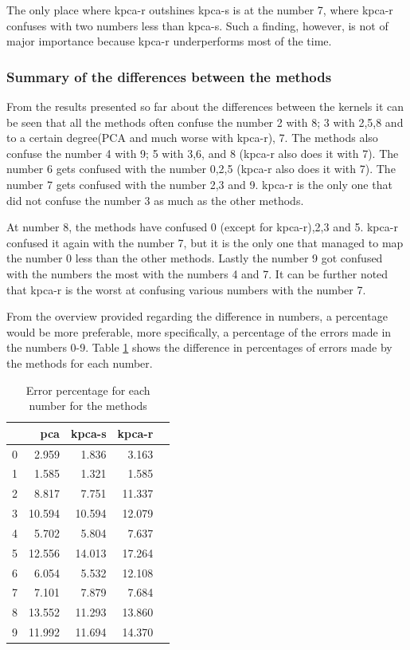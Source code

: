 The only place where \gls{kpca-r} outshines \gls{kpca-s} is at the number 7, where \gls{kpca-r} confuses with two numbers less than \gls{kpca-s}. Such a finding, however, is not of major importance because \gls{kpca-r} underperforms most of the time. 

\subsubsection{Summary of the differences between the methods}
From the results presented so far about the differences between the kernels it can be seen that all the methods often confuse the number 2 with 8; 3 with 2,5,8 and to a certain degree(PCA and much worse with \gls{kpca-r}), 7. The methods also confuse the number 4 with 9; 5 with 3,6, and 8 (\gls{kpca-r} also does it with 7). The number 6 gets confused with the number 0,2,5 (\gls{kpca-r} also does it with 7).
The number 7 gets confused with the number 2,3 and 9. \gls{kpca-r} is the only one that did not confuse the number 3 as much as the other methods.

At number 8, the methods have confused 0 (except for \gls{kpca-r}),2,3 and 5. \gls{kpca-r} confused it again with the number 7, but it is the only one that managed to map the number 0 less than the other methods. Lastly the number 9 got confused with the numbers the most with the numbers 4 and 7. It can be further noted that \gls{kpca-r} is the worst at confusing various numbers with the number 7.


From the overview provided regarding the difference in numbers, a percentage would be more preferable, more specifically, a percentage of the errors made in the numbers 0-9. Table \ref{tab:error-percentage-pca-kpca-s-kpca-r} shows the difference in percentages of errors made by the methods for each number.

\begin{table}[htb!]
    \centering
    \begin{tabular}{lrrrr}
        \toprule
          & pca    & kpca-s & kpca-r \\
        \midrule
        0 & 2.959  & 1.836  & 3.163  \\
        1 & 1.585  & 1.321  & 1.585  \\
        2 & 8.817  & 7.751  & 11.337 \\
        3 & 10.594 & 10.594 & 12.079 \\
        4 & 5.702  & 5.804  & 7.637  \\
        5 & 12.556 & 14.013 & 17.264 \\
        6 & 6.054  & 5.532  & 12.108 \\
        7 & 7.101  & 7.879  & 7.684  \\
        8 & 13.552 & 11.293 & 13.860 \\
        9 & 11.992 & 11.694 & 14.370 \\
        \bottomrule
    \end{tabular}
    \caption{Error percentage for each number for the methods}
    \label{tab:error-percentage-pca-kpca-s-kpca-r}
\end{table}

